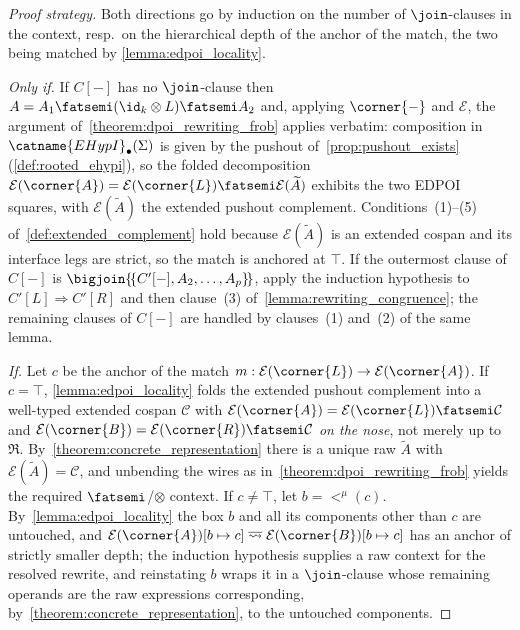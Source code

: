\begin{proof}[Proof strategy]
Both directions go by induction on the number of $\join$-clauses in the context, resp.\
on the hierarchical depth of the anchor of the match, the two being matched by
\cref{lemma:edpoi_locality}.

\emph{Only if.}
If $C[-]$ has no $\join$-clause then $A = A_{1} \fatsemi (\id_{k} \otimes L) \fatsemi A_{2}$
and, applying $\corner{-}$ and $\mathcal{E}$, the argument
of~\cref{theorem:dpoi_rewriting_frob} applies verbatim: composition in
$\catname{EHypI}_{\bullet}(\Sigma)$ is given by the pushout
of~\cref{prop:pushout_exists} (\cref{def:rooted_ehypi}), so the folded decomposition
$\mathcal{E}(\corner{A}) = \mathcal{E}(\corner{L}) \fatsemi \mathcal{E}(\widetilde{A})$
exhibits the two EDPOI squares, with $\mathcal{E}(\widetilde{A})$ the extended pushout
complement.
Conditions~(1)--(5) of~\cref{def:extended_complement} hold because
$\mathcal{E}(\widetilde{A})$ is an extended cospan and its interface legs are strict, so
the match is anchored at $\top$.
If the outermost clause of $C[-]$ is
$\bigjoin\{\!\{C'[-], A_{2}, \ldots, A_{p}\}\!\}$, apply the induction hypothesis to
$C'[L] \Rightarrow C'[R]$ and then clause~(3)
of~\cref{lemma:rewriting_congruence}; the remaining clauses of $C[-]$ are handled by
clauses~(1) and~(2) of the same lemma.

\emph{If.}
Let $c$ be the anchor of the match $m : \mathcal{E}(\corner{L}) \to
\mathcal{E}(\corner{A})$.
If $c = \top$, \cref{lemma:edpoi_locality} folds the extended pushout complement into a
well-typed extended cospan $\mathcal{C}$ with
$\mathcal{E}(\corner{A}) = \mathcal{E}(\corner{L}) \fatsemi \mathcal{C}$ and
$\mathcal{E}(\corner{B}) = \mathcal{E}(\corner{R}) \fatsemi \mathcal{C}$
\emph{on the nose}, not merely up to $\mathfrak{R}$.
By~\cref{theorem:concrete_representation} there is a unique raw $\widetilde{A}$ with
$\mathcal{E}(\widetilde{A}) = \mathcal{C}$, and unbending the wires as
in~\cref{theorem:dpoi_rewriting_frob} yields the required $\fatsemi$/$\otimes$ context.
If $c \neq \top$, let $b = {<^{\mu}}(c)$.
By~\cref{lemma:edpoi_locality} the box $b$ and all its components other than $c$ are
untouched, and $\mathcal{E}(\corner{A})[b \mapsto c] \;\overline{\rightsquigarrow}\;
\mathcal{E}(\corner{B})[b \mapsto c]$ has an anchor of strictly smaller depth; the
induction hypothesis supplies a raw context for the resolved rewrite, and reinstating $b$
wraps it in a $\join$-clause whose remaining operands are the raw expressions
corresponding, by~\cref{theorem:concrete_representation}, to the untouched components.
\end{proof}

